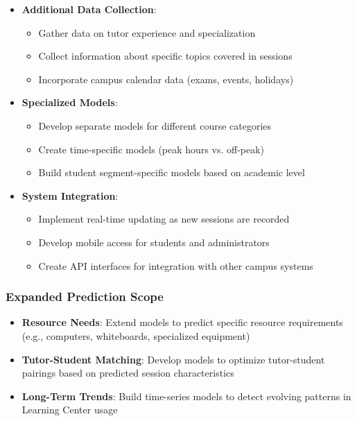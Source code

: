 \documentclass[12pt,letterpaper]{article}
\begin{document}
\begin{itemize}
    \item \textbf{Additional Data Collection}:
    \begin{itemize}
        \item Gather data on tutor experience and specialization
        \item Collect information about specific topics covered in sessions
        \item Incorporate campus calendar data (exams, events, holidays)
    \end{itemize}
    
    \item \textbf{Specialized Models}:
    \begin{itemize}
        \item Develop separate models for different course categories
        \item Create time-specific models (peak hours vs. off-peak)
        \item Build student segment-specific models based on academic level
    \end{itemize}
    
    \item \textbf{System Integration}:
    \begin{itemize}
        \item Implement real-time updating as new sessions are recorded
        \item Develop mobile access for students and administrators
        \item Create API interfaces for integration with other campus systems
    \end{itemize}
\end{itemize}

\subsubsection{Expanded Prediction Scope}

\begin{itemize}
    \item \textbf{Resource Needs}: Extend models to predict specific resource requirements (e.g., computers, whiteboards, specialized equipment)
    
    \item \textbf{Tutor-Student Matching}: Develop models to optimize tutor-student pairings based on predicted session characteristics
    
    \item \textbf{Long-Term Trends}: Build time-series models to detect evolving patterns in Learning Center usage
\end{itemize}
\end{document}
